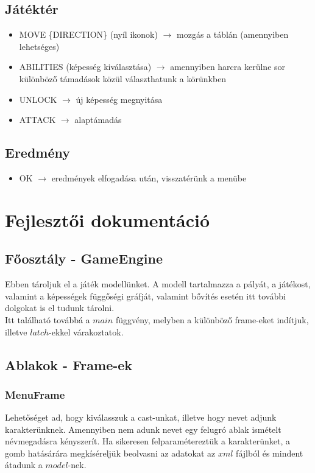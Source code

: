\documentclass[12pt,a4paper]{article}
\begin{document}
	\subsection{Játéktér}
	\begin{itemize}
		\item MOVE \{DIRECTION\} (nyíl ikonok) $\rightarrow$ mozgás a táblán (amennyiben lehetséges)
		\item ABILITIES (képesség kiválasztása) $\rightarrow$ amennyiben harcra kerülne sor különböző támadások közül választhatunk a körünkben
		\item UNLOCK $\rightarrow$ új képesség megnyitása
		\item ATTACK $\rightarrow$ alaptámadás
		
	\end{itemize}
	
	\subsection{Eredmény}
	\begin{itemize}
		\item OK $\rightarrow$ eredmények elfogadása után, visszatérünk a menübe
	\end{itemize}
	
	\section{Fejlesztői dokumentáció}
	\subsection{Főosztály - GameEngine}
	Ebben tároljuk el a játék modellünket. A modell tartalmazza a pályát, a játékost, valamint a képességek függőségi gráfját, valamint bővítés esetén itt további dolgokat is el tudunk tárolni. \\
	Itt található továbbá a $main$ függvény, melyben a különböző frame-eket indítjuk, illetve $latch$-ekkel várakoztatok.
	
	\subsection{Ablakok - Frame-ek}
	\subsubsection{MenuFrame}
	Lehetőséget ad, hogy kiválasszuk a cast-unkat, illetve hogy nevet adjunk karakterünknek. Amennyiben nem adunk nevet egy felugró ablak ismételt névmegadásra kényszerít. Ha sikeresen felparamétereztük a karakterünket, a gomb hatásárára megkíséreljük beolvasni az adatokat az $xml$ fájlból és mindent átadunk a $model$-nek.
	
\end{document}
